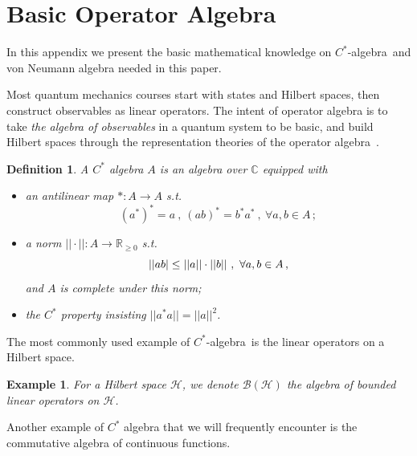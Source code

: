\documentclass[a4paper,11pt]{article}
\newtheorem{defn}[lemma]{Definition}
\newtheorem{exm}[lemma]{Example}
\newcommand{\Ch}{\mathrm{Ch}}
\newcommand{\CH}{\Ch_{\mu_1\mu_2}(Q_F,{t},{q})}
\newcommand{\be}{\begin{equation}}
\newcommand{\ee}{\end{equation}}
\def\bbC{\mathbb{C}}
\def\bbR{\mathbb{R}}
\def\CH{\mathcal{H}}
\def\calg{$C^*$-algebra\ }
\begin{document}
\appendix

\section{Basic Operator Algebra}\label{app:OperA}


In this appendix we present the basic mathematical knowledge on \calg and von Neumann algebra needed in this paper.

Most quantum mechanics courses start with states and Hilbert spaces, then construct observables as linear operators. The intent of operator algebra is to take \emph{the algebra of observables} in a quantum system to be basic, and build Hilbert spaces through the representation theories of the operator algebra~\cite{Gelfand1987OnTE,Farah:2019,Takesaki:1979}.

\begin{defn}
    A {\rm $C^*$ algebra} $A$ is an algebra over $\bbC$ equipped with
    \begin{itemize}
        \item an antilinear map $*:A\to A$ s.t.
        \be (a^{*})^* = a \ , \ (ab)^* = b^*a^* \ , \ \forall a,b\in A \, ; \ee
        \item a norm $|| \cdot ||:A\to \bbR_{\geq 0}$ s.t. \be ||ab|\le ||a||\cdot \\ ||b|| \ , \ \forall a,b\in A\,,\ee and $A$ is complete under this norm;
        \item the $C^*$ property insisting $||a^*a|| = ||a||^2$.
    \end{itemize}
\end{defn}
The most commonly used example of \calg is the linear operators on a Hilbert space.
\begin{exm}
    For a Hilbert space $\CH$, we denote $\mathscr{B}(\CH)$ the algebra of bounded linear operators on $\CH$.
\end{exm}
Another example of $C^*$ algebra that we will frequently encounter is the commutative algebra of continuous functions.
\end{document}
